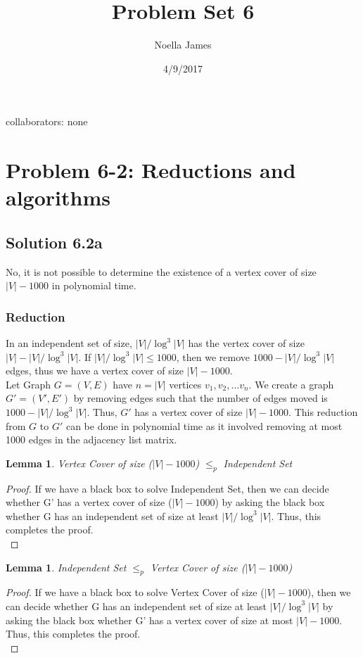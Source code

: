 \documentclass{article}
\theoremstyle{definition}
\theoremstyle{remark}
\theoremstyle{plain}
\newtheorem{lem}[thm]{Lemma}
\begin{document}
\title{Problem Set 6}
\date{4/9/2017}
\author{Noella James}
\maketitle
collaborators: none\\

\section*{Problem 6-2: Reductions and algorithms}

\subsection*{Solution 6.2a}

No, it is not possible to determine the existence of a vertex cover of size $|V| - 1000$ in polynomial time.\\

\subsubsection*{Reduction}

In an independent set of size, $|V|/\log^{3}|V|$ has the vertex cover of size $|V| - |V|/\log^{3}|V|$. If $|V|/\log^{3}|V| \leq 1000$, then we remove $1000 - |V|/\log^{3}|V|$ edges, thus we have a vertex cover of size $|V| - 1000$.\\

Let Graph $G = (V,E)$ have $n = |V|$ vertices $v_1, v_2, \ldots v_n$. We create a graph $G' = (V', E')$ by removing edges such that the number of edges moved is $1000 - |V|/\log^{3}|V|$. Thus, $G'$ has a vertex cover of size $|V| - 1000$. This reduction from $G$ to $G'$ can be done in polynomial time as it involved removing at most 1000 edges in the adjacency list matrix.


\begin{lem}
Vertex Cover of size ($|V| - 1000$) $\leq _p$ Independent Set
\end{lem}
\begin{proof}
If we have a black box to solve Independent Set, then we can decide whether G' has a vertex cover of size ($|V| - 1000$) by asking the black box whether G has an independent set of size at least $|V|/\log^{3}|V|$.
Thus, this completes the proof.\\
\end{proof}

\begin{lem}
Independent Set  $\leq _p$ Vertex Cover of size ($|V| - 1000$)
\end{lem}
\begin{proof}
If we have a black box to solve Vertex Cover of size ($|V| - 1000$), then we can decide whether G has an independent set of size at least $|V|/\log^{3}|V|$ by asking the black box whether G' has a vertex cover of size at most $|V|-1000$.
Thus, this completes the proof.\\
\end{proof}
\end{document}
